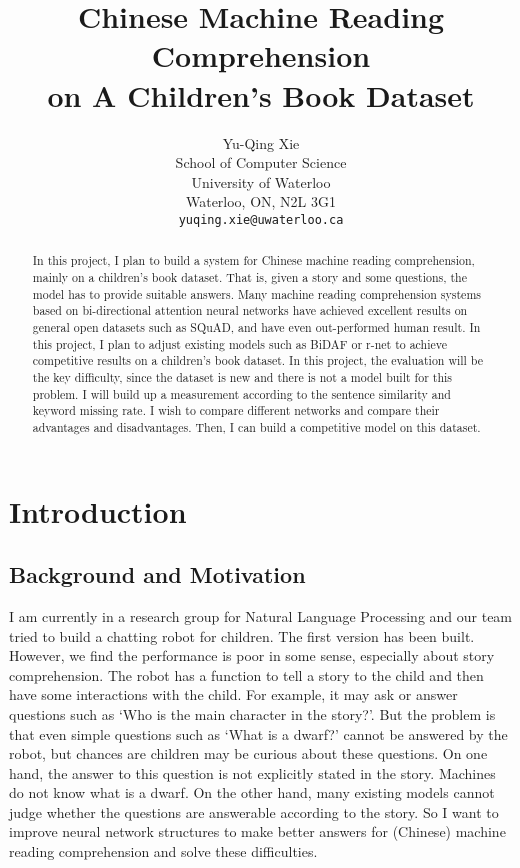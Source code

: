 \documentclass{article}
\title{Chinese Machine Reading Comprehension \\ on A Children's Book Dataset}
\author{
	Yu-Qing Xie \\
	School of Computer Science\\
	University of Waterloo\\
	Waterloo, ON, N2L 3G1 \\
	\texttt{yuqing.xie@uwaterloo.ca} \\
}
\begin{document}
\maketitle

\begin{abstract} 
In this project, I plan to build a system for Chinese machine reading comprehension, mainly on a children's book dataset. That is, given a story and some questions, the model has to provide suitable answers. Many machine reading comprehension systems based on bi-directional attention neural networks have achieved excellent results on general open datasets such as SQuAD\cite{SQuAD1.0}\cite{SQuAD2.0}, and have even out-performed human result. In this project, I plan to adjust existing models such as BiDAF\cite{BiDAF} or r-net\cite{r-net} to achieve competitive results on a children's book dataset. In this project, the evaluation will be the key difficulty, since the dataset is new and there is not a model built for this problem. I will build up a measurement according to the sentence similarity and keyword missing rate. I wish to compare different networks and compare their advantages and disadvantages. Then, I can build a competitive model on this dataset.
\end{abstract} 

\section{Introduction}
\subsection{Background and Motivation}
I am currently in a research group for Natural Language Processing and our team tried to build a chatting robot for children. The first version has been built. However, we find the performance is poor in some sense, especially about story comprehension. The robot has a function to tell a story to the child and then have some interactions with the child. For example, it may ask or answer questions such as `Who is the main character in the story?'. But the problem is that even simple questions such as `What is a dwarf?'  cannot be answered by the robot, but chances are children may be curious about these questions. On one hand, the answer to this question is not explicitly stated in the story. Machines do not know what is a dwarf. On the other hand, many existing models cannot judge whether the questions are answerable according to the story. So I want to improve neural network structures to make better answers for (Chinese) machine reading comprehension and solve these difficulties.
\end{document}
